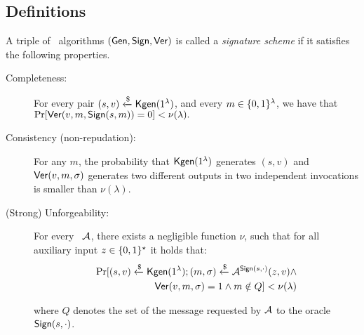 \subsection{Definitions}\label{se:moredefinitions}

\begin{definition}\label{def:signature} A triple of \ppt\ algorithms $(\mathsf{Gen},\mathsf{Sign},\mathsf{Ver})$
is called a {\em signature scheme} if it satisfies the following properties.

\begin{description}

\item[Completeness:] For every pair $(s,v) \xleftarrow{\text{\$}} \mathsf{Kgen}(1^\lambda)$,
    and every $m \in \{0,1\}^{\lambda}$, we have that $\Pr[\mathsf{Ver}(v, m,\mathsf{Sign}(s, m))=0]<\nu(\lambda).$
\item[Consistency (non-repudation):] For any $m$, the probability that $\mathsf{Kgen}(1^\lambda)$ generates $(s,v)$
and $\mathsf{Ver}(v,m,\sigma)$ generates two different outputs in two independent invocations is smaller than $\nu(\lambda)$.


\item[(Strong) Unforgeability:] For every \ppt\ $\mathcal{A}$, there exists a negligible function $\nu$,  such that for all auxiliary input $z\in \{0,1\}^{\star}$ it holds that:
	\begin{equation*}\begin{split}
\Pr[(s,v) \xleftarrow{\text{\$}} \mathsf{Kgen}(1^\lambda); (m,\sigma)\xleftarrow{\text{\$}}\mathcal{A}^{\mathsf{Sign}(s,\cdot)}(z,v) \wedge \\
  \mathsf{Ver}(v,m,\sigma)=1 \wedge m \notin Q] < \nu(\lambda)
	\end{split}\end{equation*}
	
where $Q$ denotes the set of the message requested by $\mathcal{A}$ to the oracle $\mathsf{Sign}(s,\cdot)$.
\end{description}
 \end{definition}
 
